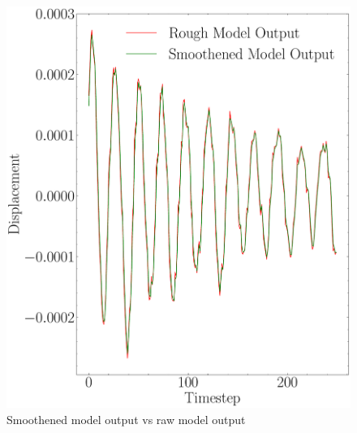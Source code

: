\begin{figure}[H]
    \centering
    \includegraphics[scale=0.5]{images/fig_chapter4/nn_related/rough_mo_smooth_mo.pdf}
    \caption{Smoothened model output vs raw model output}
    \label{fig:rough_mo_smooth_mo}
\end{figure}

